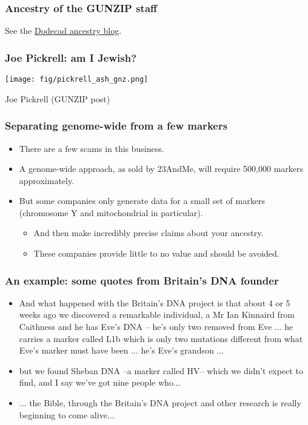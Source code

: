 \documentclass{beamer}
\begin{document}
\begin{frame}
  \frametitle{Ancestry of the GUNZIP staff}
  \begin{center}
  \end{center}
  See the \href{http://dodecad.blogspot.co.uk/}{Dodecad ancestry blog}.
\end{frame}


\begin{frame}
  \frametitle{Joe Pickrell: am I Jewish?}
  \begin{center}
    \texttt{[image: fig/pickrell\_ash\_gnz.png]}
  \end{center}
  Joe Pickrell (GUNZIP post)
\end{frame}



\begin{frame}
  \frametitle{Separating genome-wide from a few markers}
   \begin{itemize}
   \item There are a few scams in this business.
   \item A genome-wide approach, as sold by 23AndMe, will require 500,000 markers approximately.
   \item But some companies only generate data for a small set of markers (chromosome Y and mitochondrial in particular).
     \begin{itemize}
     \item And then make incredibly precise claims about your ancestry.
     \item These companies provide little to no value and should be avoided.
     \end{itemize}
   \end{itemize}
\end{frame}


\begin{frame}
  \frametitle{An example: some quotes from Britain's DNA founder}
   \begin{itemize}
   \item And what happened with the Britain's DNA project is that about 4 or 5 weeks ago we discovered a remarkable individual, a Mr Ian Kinnaird from Caithness and he has Eve's DNA – he's only two removed from Eve ... he carries a marker called L1b which is only two mutations different from what Eve's marker must have been ... he's Eve's grandson ... 
   \item but we found Sheban DNA –a marker called HV– which we didn’t expect to find, and I say we've got nine people who...
   \item ... the Bible, through the Britain's DNA project and other research is really beginning to come alive...
   \end{itemize}
\end{frame}
\end{document}
